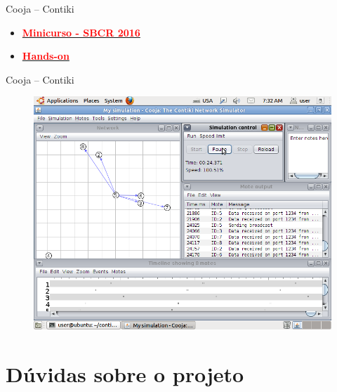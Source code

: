 \documentclass{beamer}
\begin{document}
\begin{frame}

\begin{block}{Cooja -- Contiki}

	\begin{itemize}
        \item \href{http://homepages.dcc.ufmg.br/~bruno.ps/iot-tp-sbrc-2016/}{\textcolor{red}{\textbf{Minicurso - SBCR 2016}}}
        \item \href{https://www.youtube.com/watch?v=62dzCelBwIk}{\textcolor{red}{\textbf{Hands-on}}}
    \end{itemize}

\end{block}

\begin{block}{Cooja -- Contiki}

	\begin{figure}[t]
		\includegraphics[width=.8\linewidth]{img/cooja.png}
	\end{figure}

\end{block}

\end{frame}
%
\section{Dúvidas sobre o projeto}
\end{document}

